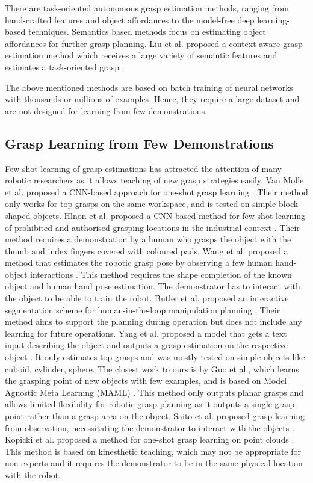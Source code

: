 \documentclass[letterpaper]{article} %
\begin{document}
There are task-oriented autonomous grasp estimation methods, ranging from hand-crafted features and object affordances to the model-free deep learning-based techniques. Semantics based methods focus on estimating object affordances \cite{do2018affordancenet} for further grasp planning.
Liu et al.  proposed a context-aware grasp estimation method which receives a large variety of semantic features and estimates a task-oriented grasp \cite{liu2020cage}. 

The above mentioned methods are based on batch training of neural networks with thousands or millions of examples. Hence, they require a large dataset and are not designed for learning from few demonstrations.

\subsection{Grasp Learning from Few Demonstrations}

Few-shot learning of grasp estimations has attracted the attention of many robotic researchers as it allows teaching of new grasp strategies easily. Van Molle et al. proposed a CNN-based approach for one-shot grasp learning \cite{van2018learning}. Their method only works for top grasps on the same workspace, and is tested on simple block shaped objects. Hlnon et al. proposed a CNN-based method for few-shot learning of prohibited and authorised grasping locations in the industrial context \cite{helenon2020learning}. Their method requires a demonstration by a human who grasps the object with the thumb and index fingers covered with coloured pads.
Wang et al. proposed a method that estimates the robotic grasp pose by observing a few human hand-object interactions \cite{wang2021demograsp}. This method requires the shape completion of the known object and human hand pose estimation. The demonstrator has to interact with the object to be able to train the robot. Butler et al. proposed an interactive segmentation scheme for human-in-the-loop manipulation planning \cite{butler2017interactive}. Their method aims to support the planning during operation but does not include any learning for future operations. Yang et al. proposed a model that gets a text input describing the object and outputs a grasp estimation on the respective object \cite{yang2021attribute}. It only estimates top grasps and was mostly tested on simple objects like cuboid, cylinder, sphere. The closest work to ours is by Guo et al., which learns the grasping point of new objects with few examples, and is based on Model Agnostic Meta Learning (MAML)  \cite{guo2022few}. This method only outputs planar grasps and allows limited flexibility for robotic grasp planning as it outputs a single grasp point rather than a grasp area on the object. Saito et al. proposed grasp learning from observation, necessitating the demonstrator to interact with the objects \cite{saito2022task}. Kopicki et al. proposed a method for one-shot grasp learning on point clouds  \cite{kopicki2016one}. This method is based on kinesthetic teaching, which may not be appropriate for non-experts and it requires the demonstrator to be in the same physical location with the robot. 
\end{document}
